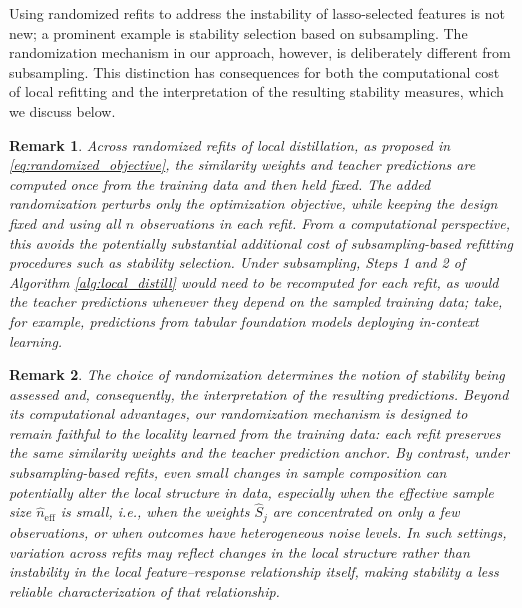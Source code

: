 \documentclass[12pt]{article}
\newtheorem{remark}{Remark}
\theoremstyle{definition}
\begin{document}
Using randomized refits to address the instability of lasso-selected features is not new; a prominent example is stability selection \citep{meinshausen2010stability} based on subsampling.
The randomization mechanism in our approach, however, is deliberately different from subsampling.
This distinction has consequences for both the computational cost of local refitting and the interpretation of the resulting stability measures, which we discuss below.

{
\small
{
\begin{remark}
Across randomized refits of local distillation, as proposed in  \eqref{eq:randomized_objective}, the similarity weights and teacher predictions are computed once from the training data and then held fixed. 
The added randomization perturbs only the optimization objective, while keeping the design fixed and using all $n$ observations in each refit.
From a computational perspective, this avoids the potentially substantial additional cost of subsampling-based refitting procedures such as stability selection. 
Under subsampling, Steps 1 and 2 of Algorithm \ref{alg:local_distill} would need to be recomputed for each refit, as would the teacher predictions whenever they depend on the sampled training data; take, for example, predictions from tabular foundation models deploying in-context learning.
\label{rem: stability sel1}
\end{remark}

\begin{remark}
The choice of randomization determines the notion of stability being assessed and, consequently, the interpretation of the resulting predictions.
Beyond its computational advantages, our randomization mechanism is designed to remain faithful to the locality learned from the training data: each refit preserves the same similarity weights and the teacher prediction anchor.
By contrast, under subsampling-based refits, even small changes in sample composition can potentially alter the local structure in data, especially when the effective sample size $\hat n_{\text{eff}}$ is small, i.e., when the weights $\hat S_j$ are concentrated on only a few observations, or when outcomes have heterogeneous noise levels. 
In such settings, variation across refits may reflect changes in the local structure rather than instability in the local feature--response relationship itself, making stability a less reliable characterization of that relationship.
\label{rem: stability sel2}
\end{remark}
}
}
\end{document}
